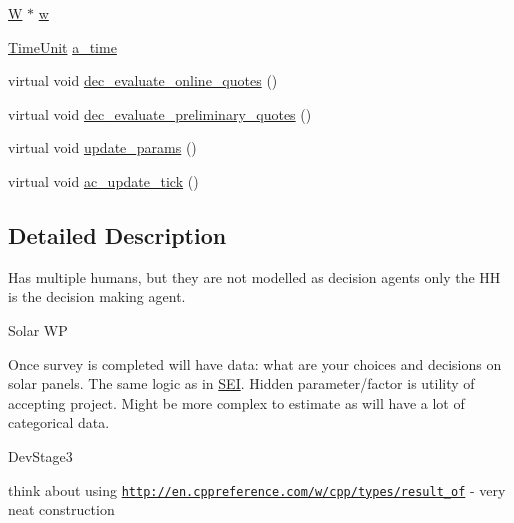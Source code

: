 {\bf }\par
\begin{DoxyCompactItemize}
\item 
\hyperlink{classsolar__core_1_1_w}{W} $\ast$ \hyperlink{classsolar__core_1_1_household_a01ac4643c725f397ba7485209a906e4d}{w}
\end{DoxyCompactItemize}

\begin{DoxyCompactItemize}
\item 
\hyperlink{namespacesolar__core_a4b5949d07259da6f8a20d12a30403e90}{Time\+Unit} \hyperlink{classsolar__core_1_1_household_ad323100235079f34537ccda656e86e64}{a\+\_\+time}
\item 
virtual void \hyperlink{classsolar__core_1_1_household_a2d8c80f6db68610fb3e0f9b48e1e490b}{dec\+\_\+evaluate\+\_\+online\+\_\+quotes} ()
\item 
virtual void \hyperlink{classsolar__core_1_1_household_a6e27e36f623bd307eedcd97c550d5c5e}{dec\+\_\+evaluate\+\_\+preliminary\+\_\+quotes} ()
\item 
virtual void \hyperlink{classsolar__core_1_1_household_a733a90456d57f698b3aa974c6c6e0108}{update\+\_\+params} ()
\item 
virtual void \hyperlink{classsolar__core_1_1_household_ac73de13d0d4b4e01b2defbb85872c4b2}{ac\+\_\+update\+\_\+tick} ()
\end{DoxyCompactItemize}


\subsection{Detailed Description}
Has multiple humans, but they are not modelled as decision agents only the H\+H is the decision making agent.

\begin{DoxyRefDesc}{Solar W\+P}
\item[\hyperlink{wp__wp000001}{Solar W\+P}]Once survey is completed will have data\+: what are your choices and decisions on solar panels. The same logic as in \hyperlink{classsolar__core_1_1_s_e_i}{S\+E\+I}. Hidden parameter/factor is utility of accepting project. Might be more complex to estimate as will have a lot of categorical data.\end{DoxyRefDesc}


\begin{DoxyRefDesc}{Dev\+Stage3}
\item[\hyperlink{_dev_stage3__DevStage3000002}{Dev\+Stage3}]think about using \href{http://en.cppreference.com/w/cpp/types/result_of}{\tt http\+://en.\+cppreference.\+com/w/cpp/types/result\+\_\+of} -\/ very neat construction\end{DoxyRefDesc}


